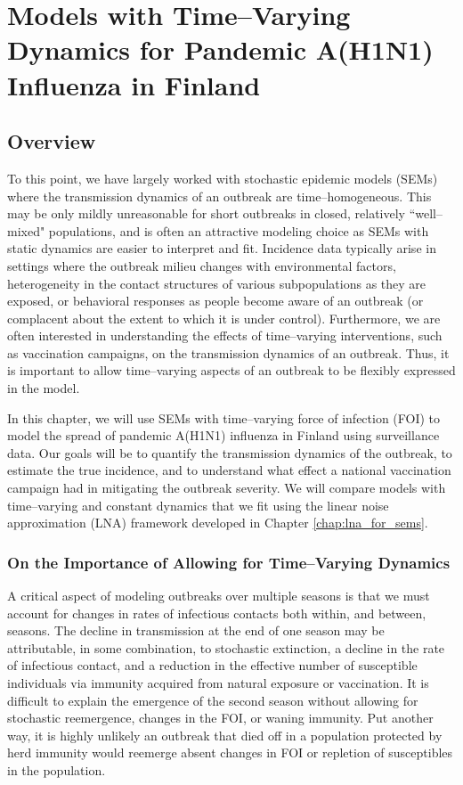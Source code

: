 \chapter{Models with Time--Varying Dynamics for Pandemic A(H1N1) Influenza in Finland}
\label{chap:lna_extensions}

\section{Overview}
\label{sec:lna_extensions_overview}
To this point, we have largely worked with stochastic epidemic models (SEMs) where the transmission dynamics of an outbreak are time--homogeneous. This may be only mildly unreasonable for short outbreaks in closed, relatively ``well--mixed" populations, and is often an attractive modeling choice as SEMs with static dynamics are easier to interpret and fit. Incidence data typically arise in settings where the outbreak milieu changes with environmental factors, heterogeneity in the contact structures of various subpopulations as they are exposed, or behavioral responses as people become aware of an outbreak (or complacent about the extent to which it is under control). Furthermore, we are often interested in understanding the effects of time--varying interventions, such as vaccination campaigns, on the transmission dynamics of an outbreak. Thus, it is important to allow time--varying aspects of an outbreak to be flexibly expressed in the model.

In this chapter, we will use SEMs with time--varying force of infection (FOI) to model the spread of pandemic A(H1N1) influenza in Finland using surveillance data. Our goals will be to quantify the transmission dynamics of the outbreak, to estimate the true incidence, and to understand what effect a national vaccination campaign had in mitigating the outbreak severity. We will compare models with time--varying and constant dynamics that we fit using the linear noise approximation (LNA) framework developed in Chapter \ref{chap:lna_for_sems}.

\subsection{On the Importance of Allowing for Time--Varying Dynamics}
\label{subsec:tparam_motivation}

A critical aspect of modeling outbreaks over multiple seasons is that we must account for changes in rates of infectious contacts both within, and between, seasons. The decline in transmission at the end of one season may be attributable, in some combination, to stochastic extinction, a decline in the rate of infectious contact, and a reduction in the effective number of susceptible individuals via immunity acquired from natural exposure or vaccination. It is difficult to explain the emergence of the second season without allowing for stochastic reemergence, changes in the FOI, or waning immunity. Put another way, it is highly unlikely an outbreak that died off in a population protected by herd immunity would reemerge absent changes in FOI or repletion of susceptibles in the population. 

